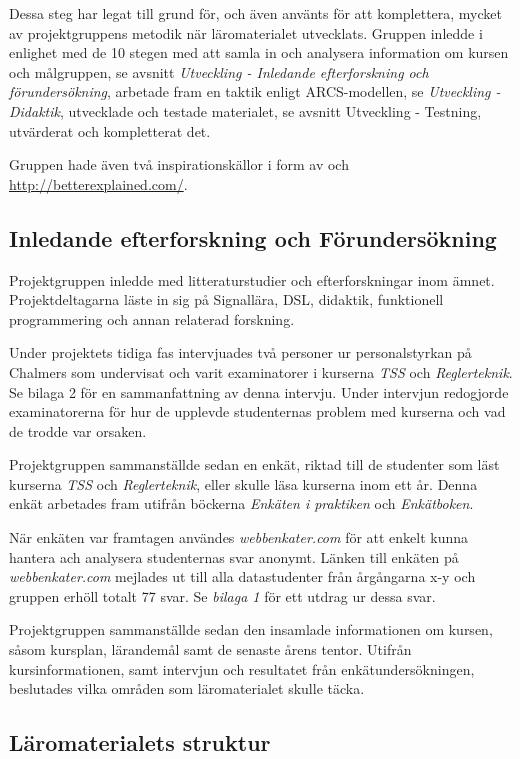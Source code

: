 \documentclass[]{article}
\begin{document}
Dessa steg har legat till grund för, och även använts för att komplettera, mycket av projektgruppens metodik när
läromaterialet utvecklats. Gruppen inledde i enlighet med de 10 stegen med att samla in och analysera information om
kursen och målgruppen, se avsnitt \textit{Utveckling - Inledande efterforskning och förundersökning}, arbetade fram en taktik
enligt ARCS-modellen, se \textit{Utveckling - Didaktik}, utvecklade och testade materialet, se avsnitt
{Utveckling - Testning}, utvärderat och kompletterat det.

Gruppen hade även två inspirationskällor i form av \cite{learnyouahaskell} och \url{http://betterexplained.com/}.


\subsection{Inledande efterforskning och Förundersökning}

Projektgruppen inledde med litteraturstudier och efterforskningar inom ämnet. Projektdeltagarna läste in sig på
Signallära, DSL, didaktik, funktionell programmering och annan relaterad forskning.

Under projektets tidiga fas intervjuades två personer ur personalstyrkan på Chalmers som undervisat och varit
examinatorer i kurserna \textit{TSS} och \textit{Reglerteknik}. Se {bilaga 2} för en sammanfattning av denna intervju.
Under intervjun redogjorde examinatorerna för hur de upplevde studenternas problem med kurserna och vad de trodde var
orsaken.

Projektgruppen sammanställde sedan en enkät, riktad till de studenter som läst kurserna \textit{TSS} och
\textit{Reglerteknik}, eller skulle läsa kurserna inom ett år. Denna enkät arbetades fram utifrån böckerna
\textit{Enkäten i praktiken} och \textit{Enkätboken}.

När enkäten var framtagen användes \textit{webbenkater.com} för att enkelt kunna hantera ach analysera studenternas svar
anonymt. Länken till enkäten på \textit{webbenkater.com} mejlades ut till alla datastudenter från årgångarna x-y och
gruppen erhöll totalt 77 svar.  Se \textit{bilaga 1} för ett utdrag ur dessa svar.

Projektgruppen sammanställde sedan den insamlade informationen om kursen, såsom kursplan, lärandemål samt de senaste
årens tentor. Utifrån kursinformationen, samt intervjun och resultatet från enkätundersökningen, beslutades vilka
områden som läromaterialet skulle täcka.


\subsection{Läromaterialets struktur}
\end{document}
